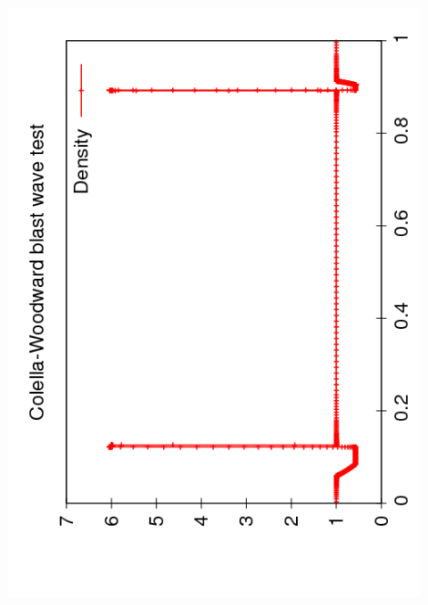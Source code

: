 \documentclass{beamer}
\begin{document}
\begin{frame}
\begin{columns}
\begin{column}{0.5\textwidth}
\begin{overlayarea}{\textwidth}{0.9\textheight}
{          \includegraphics[angle=-90,width=0.9\textwidth]{figures/AMR_Density_10}\\
}
\end{overlayarea}
\end{column}
\end{columns}
\end{frame}
\end{document}
